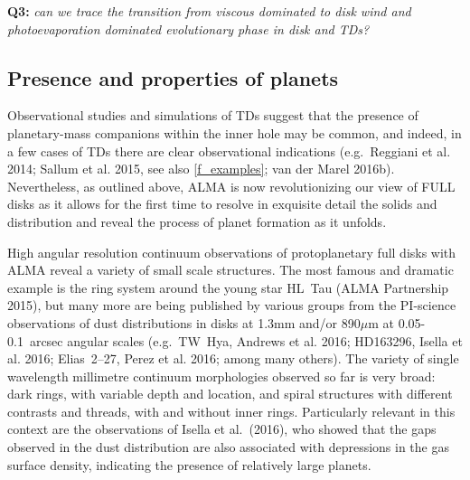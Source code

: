 \documentclass[10pt,fleqn,twoside]{article}
\begin{document}
\smallskip
{\bf Q3:} {\it can we trace the transition from viscous dominated to disk wind and photoevaporation dominated evolutionary phase in disk and TDs?}

\subsection{Presence and properties of planets}

Observational studies and simulations of TDs suggest that the presence of planetary-mass companions within the inner hole may be common, and indeed, in a few cases of TDs there are clear observational indications (e.g.\ Reggiani et al. 2014; Sallum et al. 2015, see also \ref{f_examples}; van der Marel 2016b).
Nevertheless, 
as outlined above, ALMA is now revolutionizing our view of FULL disks as it allows for the first time to resolve in exquisite detail the solids and distribution and reveal the process of planet formation as it unfolds.

High angular resolution continuum observations of protoplanetary full disks with ALMA reveal a variety of small scale structures. The most famous and dramatic example is the ring system around the young star HL~Tau (ALMA Partnership 2015), but many more are being published by various groups from the PI-science observations of dust distributions in disks at 1.3mm and/or 890$\mu$m at 0.05-0.1~arcsec angular scales (e.g.\ TW~Hya, Andrews et al. 2016; HD163296, Isella et al. 2016; Elias~2--27, Perez et al. 2016; among many others). The variety of single wavelength millimetre continuum morphologies observed so far is very broad: dark rings, with variable depth and location, and spiral structures with different contrasts and threads, with and without inner rings. Particularly relevant in this context are the observations of Isella et al.~(2016), who showed that the gaps observed in the dust distribution are also associated with depressions in the gas surface density, indicating the presence of relatively large planets.
\end{document}
